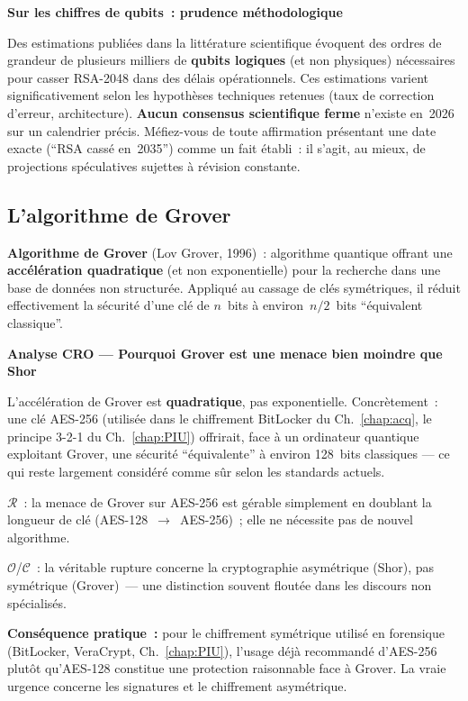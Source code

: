 \begin{boxalert}
\textbf{Sur les chiffres de qubits~: prudence méthodologique}

Des estimations publiées dans la littérature scientifique évoquent
des ordres de grandeur de plusieurs milliers de \textbf{qubits
logiques} (et non physiques) nécessaires pour casser RSA-2048 dans
des délais opérationnels. Ces estimations varient significativement
selon les hypothèses techniques retenues (taux de correction
d'erreur, architecture). \textbf{Aucun consensus scientifique
ferme} n'existe en~2026 sur un calendrier précis. Méfiez-vous de
toute affirmation présentant une date exacte (``RSA cassé en~2035'')
comme un fait établi~: il s'agit, au mieux, de projections
spéculatives sujettes à révision constante.
\end{boxalert}

\subsection{L'algorithme de Grover}

\begin{boxdef}
\textbf{Algorithme de Grover}
(Lov Grover, 1996)~: algorithme quantique offrant une
\textbf{accélération quadratique} (et non exponentielle) pour
la recherche dans une base de données non structurée. Appliqué
au cassage de clés symétriques, il réduit effectivement la
sécurité d'une clé de $n$~bits à environ~$n/2$~bits
``équivalent classique''.
\end{boxdef}

\begin{boxCRO}
\textbf{Analyse CRO --- Pourquoi Grover est une menace bien moindre que Shor}

L'accélération de Grover est \textbf{quadratique}, pas exponentielle.
Concrètement~: une clé AES-256 (utilisée dans le chiffrement
BitLocker du Ch.~\ref{chap:acq}, le principe 3-2-1 du
Ch.~\ref{chap:PIU}) offrirait, face à un ordinateur quantique
exploitant Grover, une sécurité ``équivalente'' à environ
128~bits classiques --- ce qui reste largement considéré comme
sûr selon les standards actuels.

$\mathcal{R}$~: la menace de Grover sur AES-256 est gérable
simplement en doublant la longueur de clé (AES-128~$\to$~AES-256)~;
elle ne nécessite pas de nouvel algorithme.

$\mathcal{O}$/$\mathcal{C}$~: la véritable rupture concerne la
cryptographie asymétrique (Shor), pas symétrique (Grover)~--- une
distinction souvent floutée dans les discours non spécialisés.


\textbf{Conséquence pratique~:} pour le chiffrement symétrique
utilisé en forensique (BitLocker, VeraCrypt, Ch.~\ref{chap:PIU}),
l'usage déjà recommandé d'AES-256 plutôt qu'AES-128 constitue
une protection raisonnable face à Grover. La vraie urgence
concerne les signatures et le chiffrement asymétrique.
\end{boxCRO}

